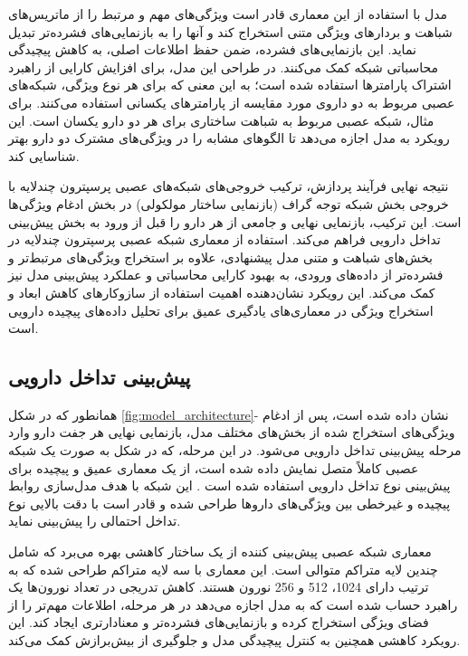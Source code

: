 مدل با استفاده از این معماری قادر است ویژگی‌های مهم و مرتبط را از ماتریس‌های شباهت و بردارهای ویژگی متنی استخراج کند و آنها را به بازنمایی‌های فشرده‌تر تبدیل نماید. این بازنمایی‌های فشرده، ضمن حفظ اطلاعات اصلی، به کاهش پیچیدگی محاسباتی شبکه کمک می‌کنند. در طراحی این مدل، برای افزایش کارایی از راهبرد اشتراک پارامترها استفاده شده است؛ به این معنی که برای هر نوع ویژگی، شبکه‌های عصبی مربوط به دو داروی مورد مقایسه از پارامترهای یکسانی استفاده می‌کنند. برای مثال، شبکه عصبی مربوط به شباهت ساختاری برای هر دو دارو یکسان است. این رویکرد به مدل اجازه می‌دهد تا الگوهای مشابه را در ویژگی‌های مشترک دو دارو بهتر شناسایی کند.

نتیجه نهایی فرآیند پردازش، ترکیب خروجی‌های شبکه‌های عصبی پرسپترون چندلایه با خروجی بخش شبکه توجه گراف (بازنمایی ساختار مولکولی) در بخش ادغام ویژگی‌ها است. این ترکیب، بازنمایی نهایی و جامعی از هر دارو را قبل از ورود به بخش پیش‌بینی تداخل دارویی فراهم می‌کند. استفاده از معماری شبکه عصبی پرسپترون چندلایه در بخش‌های شباهت و متنی مدل پیشنهادی، علاوه بر استخراج ویژگی‌های مرتبط‌تر و فشرده‌تر از داده‌های ورودی، به بهبود کارایی محاسباتی و عملکرد پیش‌بینی مدل نیز کمک می‌کند. این رویکرد نشان‌دهنده اهمیت استفاده از سازوکار‌های کاهش ابعاد و استخراج ویژگی در معماری‌های یادگیری عمیق برای تحلیل داده‌های پیچیده دارویی است.

\subsection{پیش‌بینی تداخل دارویی}

همانطور که در شکل \ref{fig:model_architecture}- نشان داده شده است، پس از ادغام ویژگی‌های استخراج شده از بخش‌های مختلف مدل، بازنمایی نهایی هر جفت دارو وارد مرحله پیش‌بینی تداخل دارویی می‌شود. در این مرحله، که در شکل به صورت یک شبکه عصبی کاملاً متصل نمایش داده شده است، از یک معماری عمیق و پیچیده برای پیش‌بینی نوع تداخل دارویی استفاده شده است \cite{ref_dai2020}. این شبکه با هدف مدل‌سازی روابط پیچیده و غیرخطی بین ویژگی‌های داروها طراحی شده و قادر است با دقت بالایی نوع تداخل احتمالی را پیش‌بینی نماید.

معماری شبکه عصبی پیش‌بینی کننده از یک ساختار کاهشی بهره می‌برد که شامل چندین لایه متراکم متوالی است. این معماری با سه لایه متراکم طراحی شده که به ترتیب دارای 1024، 512 و 256 نورون هستند. کاهش تدریجی در تعداد نورون‌ها یک راهبرد حساب شده است که به مدل اجازه می‌دهد در هر مرحله، اطلاعات مهم‌تر را از فضای ویژگی استخراج کرده و بازنمایی‌های فشرده‌تر و معنادارتری ایجاد کند. این رویکرد کاهشی همچنین به کنترل پیچیدگی مدل و جلوگیری از بیش‌برازش کمک می‌کند.


